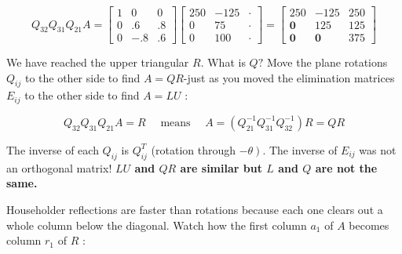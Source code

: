 \begin{example}[使用Givens进行QR分解]
\begin{equation}Q_{32} Q_{31} Q_{21} A=\left[\begin{array}{rrr}
    1 & 0 & 0 \\
    0 & .6 & .8 \\
    0 & -.8 & .6
    \end{array}\right]\left[\begin{array}{rrr}
    250 & -125 & \cdot \\
    0 & 75 & \cdot \\
    0 & 100 & \cdot
    \end{array}\right]=\left[\begin{array}{rrr}
    250 & -125 & 250 \\
    \mathbf{0} & 125 & 125 \\
    \mathbf{0} & \mathbf{0} & 375
    \end{array}\right]\end{equation}

    We have reached the upper triangular $R$. What is $Q ?$ Move the plane rotations $Q_{i j}$ to the other side to find $A=Q R$-just as you moved the elimination matrices $E_{i j}$ to the other side to find $A=L U$ :

    \begin{theorem}
      \begin{equation}
    Q_{32} Q_{31} Q_{21} A=R \quad \text { means } \quad A=\left(Q_{21}^{-1} Q_{31}^{-1} Q_{32}^{-1}\right) R=Q R
    \end{equation}  
    \end{theorem}
    
    The inverse of each $Q_{i j}$ is $Q_{i j}^{ {T}}$ (rotation through $\left.-\theta\right)$. The inverse of $E_{i j}$ was not an orthogonal matrix! \textbf{$L U$ and $Q R$ are similar but $L$ and $Q$ are not the same.}
\end{example}

Householder reflections are faster than rotations because each one clears out a whole column below the diagonal. Watch how the first column $a_{1}$ of $A$ becomes column $r_{1}$ of $R$ :

